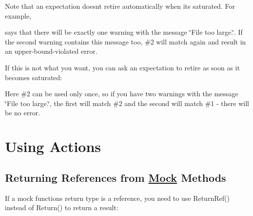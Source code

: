Note that an expectation doesn\textquotesingle{}t retire automatically when it\textquotesingle{}s saturated. For example,


\begin{DoxyCode}{0}
\end{DoxyCode}


says that there will be exactly one warning with the message {\ttfamily \char`\"{}\+File
too large.\char`\"{}}. If the second warning contains this message too, \#2 will match again and result in an upper-\/bound-\/violated error.

If this is not what you want, you can ask an expectation to retire as soon as it becomes saturated\+:


\begin{DoxyCode}{0}
\end{DoxyCode}


Here \#2 can be used only once, so if you have two warnings with the message {\ttfamily \char`\"{}\+File too large.\char`\"{}}, the first will match \#2 and the second will match \#1 -\/ there will be no error.

\section*{Using Actions}

\subsection*{Returning References from \mbox{\hyperlink{class_mock}{Mock}} Methods}

If a mock function\textquotesingle{}s return type is a reference, you need to use {\ttfamily Return\+Ref()} instead of {\ttfamily Return()} to return a result\+:


\begin{DoxyCode}{0}
\DoxyCodeLine{}
\DoxyCodeLine{\};}
\DoxyCodeLine{}
\end{DoxyCode}


